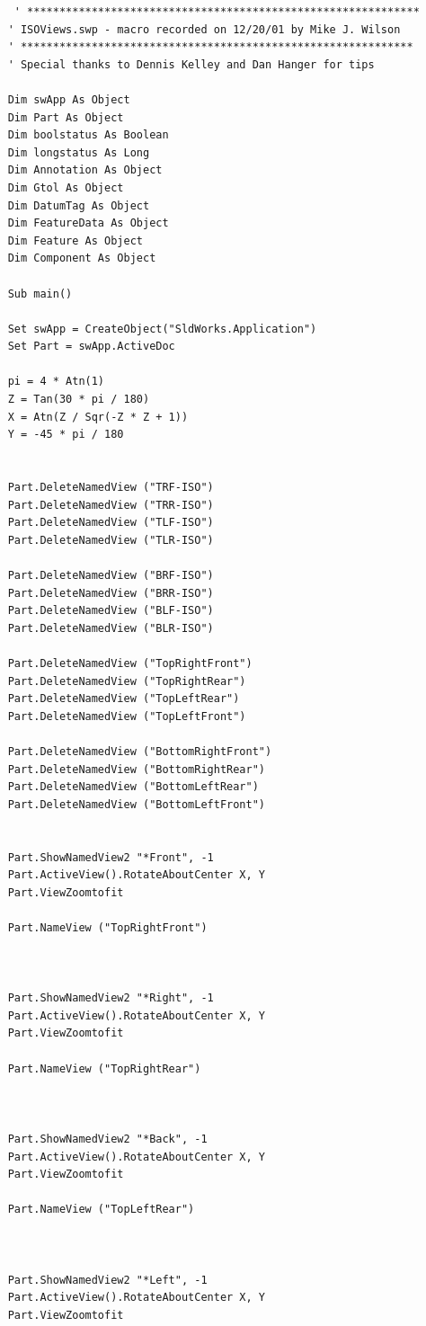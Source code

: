 \documentclass[12pt,letterpaper,final]{report}
\begin{document}
\begin{lstlisting}
	 ' *************************************************************
	' ISOViews.swp - macro recorded on 12/20/01 by Mike J. Wilson
	' *************************************************************
	' Special thanks to Dennis Kelley and Dan Hanger for tips
	
	Dim swApp As Object
	Dim Part As Object
	Dim boolstatus As Boolean
	Dim longstatus As Long
	Dim Annotation As Object
	Dim Gtol As Object
	Dim DatumTag As Object
	Dim FeatureData As Object
	Dim Feature As Object
	Dim Component As Object
	
	Sub main()
	
	Set swApp = CreateObject("SldWorks.Application")
	Set Part = swApp.ActiveDoc
	
	pi = 4 * Atn(1)
	Z = Tan(30 * pi / 180)
	X = Atn(Z / Sqr(-Z * Z + 1))
	Y = -45 * pi / 180
	
	
	Part.DeleteNamedView ("TRF-ISO")
	Part.DeleteNamedView ("TRR-ISO")
	Part.DeleteNamedView ("TLF-ISO")
	Part.DeleteNamedView ("TLR-ISO")
	
	Part.DeleteNamedView ("BRF-ISO")
	Part.DeleteNamedView ("BRR-ISO")
	Part.DeleteNamedView ("BLF-ISO")
	Part.DeleteNamedView ("BLR-ISO")
	
	Part.DeleteNamedView ("TopRightFront")
	Part.DeleteNamedView ("TopRightRear")
	Part.DeleteNamedView ("TopLeftRear")
	Part.DeleteNamedView ("TopLeftFront")
	
	Part.DeleteNamedView ("BottomRightFront")
	Part.DeleteNamedView ("BottomRightRear")
	Part.DeleteNamedView ("BottomLeftRear")
	Part.DeleteNamedView ("BottomLeftFront")
	
	
	Part.ShowNamedView2 "*Front", -1
	Part.ActiveView().RotateAboutCenter X, Y
	Part.ViewZoomtofit
	
	Part.NameView ("TopRightFront")
	
	
	
	Part.ShowNamedView2 "*Right", -1
	Part.ActiveView().RotateAboutCenter X, Y
	Part.ViewZoomtofit
	
	Part.NameView ("TopRightRear")
	
	
	
	Part.ShowNamedView2 "*Back", -1
	Part.ActiveView().RotateAboutCenter X, Y
	Part.ViewZoomtofit
	
	Part.NameView ("TopLeftRear")
	
	
	
	Part.ShowNamedView2 "*Left", -1
	Part.ActiveView().RotateAboutCenter X, Y
	Part.ViewZoomtofit
	

\end{lstlisting}
\end{document}

